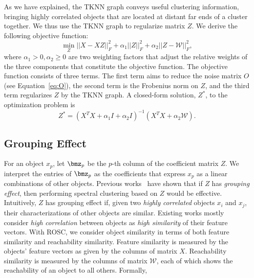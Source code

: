 As we have explained, the TKNN graph  conveys useful clustering information, bringing highly
correlated objects that are located at distant far ends of a cluster together.
We thus use the TKNN graph to regularize matrix $Z$.
We derive the following objective function:
\begin{equation}
\label{eq:obj_constraint}
\min_Z ||X-XZ||_F^2 + \alpha_1 ||Z||_F^2 + \alpha_2 ||Z-\mathcal{W}||_F^2,
\end{equation}
where $\alpha_1 > 0,\alpha_2 \geq 0$ are two 
weighting factors that adjust the relative weights of the three components that constitute
the objective function.
The objective function consists of three terms.
The first term aims to reduce the noise matrix $O$ (see Equation~\ref{eq:O}),
the second term is the Frobenius norm on $Z$, and
the third term regularizes $Z$ by the TKNN graph.
A closed-form solution, $Z^*$, to the optimization problem is
\begin{equation}
\label{eq:solution}
Z^* = (X^TX + \alpha_1I + \alpha_2I)^{-1}(X^TX+\alpha_2\mathcal{W}).
\end{equation}

\subsection*{Grouping Effect}
For an object $x_p$, 
let $\bmz_p$ be the $p$-th column of the coefficient matrix $Z$.
We interpret the entries of $\bmz_p$ as the coefficients that express $x_p$ as a linear combinations
of other objects. 
Previous works~\cite{lu2012robust,lu2013correlation,hu2014smooth} have shown that if $Z$ has {\it grouping effect}, then performing spectral 
clustering based on $Z$ would be effective. 
Intuitively, $Z$ has grouping effect if, given two {\it highly correlated} objects $x_i$ and $x_j$,
their characterizations of other objects are similar.
Existing works mostly consider {\it high correlation} between objects as {\it high similarity} of their
feature vectors. With ROSC, we consider object similarity in terms of both feature similarity and 
reachability similarity. 
Feature similarity is measured by the objects' feature vectors as given by the columns of matrix $X$.
Reachability similarity is measured by the columns of matrix $\mathcal{W}$, 
each of which shows the reachability of an object to all others. 
Formally,



